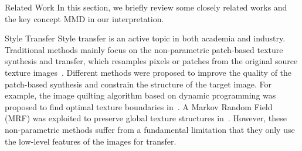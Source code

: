 \documentclass{article}
\begin{document}
\begin{section}{Related Work}
In this section, we briefly review some closely related works and the key concept MMD in our interpretation.
\begin{paragraph}{Style Transfer}
Style transfer is an active topic in both academia and industry. Traditional methods mainly focus on the non-parametric patch-based texture synthesis and transfer, which resamples pixels or patches from the original source texture images~\cite{hertzmann2001image,efros2001image,efros1999texture,liang2001real}. Different methods were proposed to improve the quality of the patch-based synthesis and constrain the structure of the target image. For example, the image quilting algorithm based on dynamic programming was proposed to find optimal texture boundaries in~\cite{efros2001image}. A Markov Random Field (MRF) was exploited to preserve global texture structures in~\cite{frigo2016split}. However, these non-parametric methods suffer from a fundamental limitation that they only use the low-level features of the images for transfer. 


\end{paragraph}
\end{section}
\end{document}
